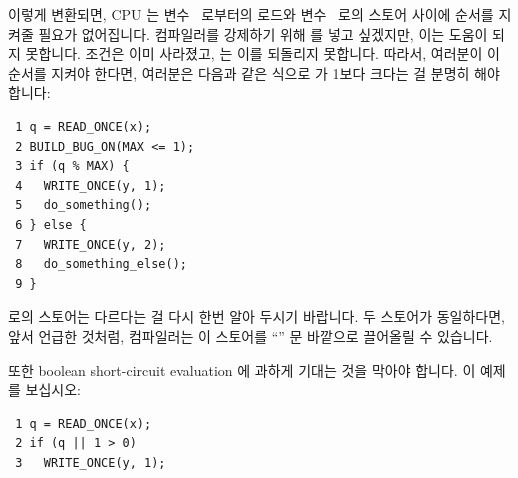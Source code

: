 이렇게 변환되면, CPU 는 변수~ 로부터의 로드와 변수~ 로의 스토어
사이에 순서를 지켜줄 필요가 없어집니다.
컴파일러를 강제하기 위해  를 넣고 싶겠지만, 이는 도움이 되지
못합니다.
조건은 이미 사라졌고,  는 이를 되돌리지 못합니다.
따라서, 여러분이 이 순서를 지켜야 한다면, 여러분은 다음과 같은 식으로 
가 1보다 크다는 걸 분명히 해야 합니다:

\vspace{5pt}
\begin{minipage}[t]{\columnwidth}
\scriptsize
\begin{verbatim}
 1 q = READ_ONCE(x);
 2 BUILD_BUG_ON(MAX <= 1);
 3 if (q % MAX) {
 4   WRITE_ONCE(y, 1);
 5   do_something();
 6 } else {
 7   WRITE_ONCE(y, 2);
 8   do_something_else();
 9 }
\end{verbatim}
\end{minipage}
\vspace{5pt}

 로의 스토어는 다르다는 걸 다시 한번 알아 두시기 바랍니다.
두 스토어가 동일하다면, 앞서 언급한 것처럼, 컴파일러는 이 스토어를 ``''
문 바깥으로 끌어올릴 수 있습니다.

또한 boolean short-circuit evaluation 에 과하게 기대는 것을 막아야 합니다.
이 예제를 보십시오:

\vspace{5pt}
\begin{minipage}[t]{\columnwidth}
\scriptsize
\begin{verbatim}
 1 q = READ_ONCE(x);
 2 if (q || 1 > 0)
 3   WRITE_ONCE(y, 1);
\end{verbatim}
\end{minipage}
\vspace{5pt}

